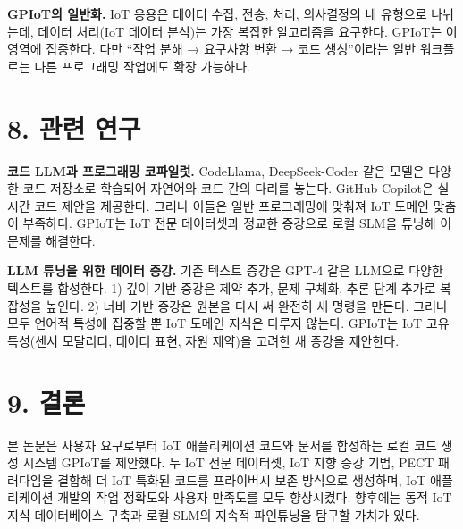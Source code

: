 \documentclass[sigconf,nonacm]{acmart}
\begin{document}
\textbf{GPIoT의 일반화.} IoT 응용은 데이터 수집, 전송, 처리, 의사결정의 네 유형으로 나뉘는데, 데이터 처리(IoT 데이터 분석)는 가장 복잡한 알고리즘을 요구한다. GPIoT는 이 영역에 집중한다. 다만 ``작업 분해 → 요구사항 변환 → 코드 생성''이라는 일반 워크플로는 다른 프로그래밍 작업에도 확장 가능하다.

\section{8. 관련 연구}

\textbf{코드 LLM과 프로그래밍 코파일럿.} CodeLlama, DeepSeek-Coder 같은 모델은 다양한 코드 저장소로 학습되어 자연어와 코드 간의 다리를 놓는다. GitHub Copilot은 실시간 코드 제안을 제공한다. 그러나 이들은 일반 프로그래밍에 맞춰져 IoT 도메인 맞춤이 부족하다. GPIoT는 IoT 전문 데이터셋과 정교한 증강으로 로컬 SLM을 튜닝해 이 문제를 해결한다.

\textbf{LLM 튜닝을 위한 데이터 증강.} 기존 텍스트 증강은 GPT-4 같은 LLM으로 다양한 텍스트를 합성한다. 1) 깊이 기반 증강은 제약 추가, 문제 구체화, 추론 단계 추가로 복잡성을 높인다. 2) 너비 기반 증강은 원본을 다시 써 완전히 새 명령을 만든다. 그러나 모두 언어적 특성에 집중할 뿐 IoT 도메인 지식은 다루지 않는다. GPIoT는 IoT 고유 특성(센서 모달리티, 데이터 표현, 자원 제약)을 고려한 새 증강을 제안한다.

\section{9. 결론}

본 논문은 사용자 요구로부터 IoT 애플리케이션 코드와 문서를 합성하는 로컬 코드 생성 시스템 GPIoT를 제안했다. 두 IoT 전문 데이터셋, IoT 지향 증강 기법, PECT 패러다임을 결합해 더 IoT 특화된 코드를 프라이버시 보존 방식으로 생성하며, IoT 애플리케이션 개발의 작업 정확도와 사용자 만족도를 모두 향상시켰다. 향후에는 동적 IoT 지식 데이터베이스 구축과 로컬 SLM의 지속적 파인튜닝을 탐구할 가치가 있다.

\balance
\end{document}

